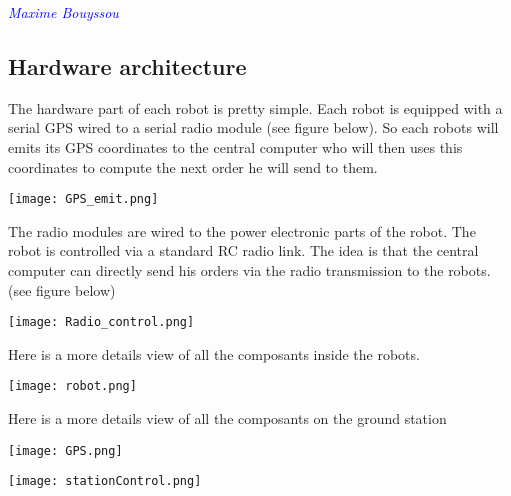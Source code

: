 \textcolor{blue}{\textit{Maxime Bouyssou}}



\subsection{Hardware architecture}
The hardware part of each robot is pretty simple. Each robot is equipped with a serial GPS wired to a serial radio module (see figure below). So each robots will emits its GPS coordinates to the central computer who will then uses this coordinates to compute the next order he will send to them.

\begin{center}
\texttt{[image: GPS\_emit.png]} 
\label{fig1}
\end{center}

The radio modules are wired to the power electronic parts of the robot. The robot is controlled via a standard RC radio link. The idea is that the central computer can directly send his orders via the radio transmission to the robots. (see figure below)

\begin{center}
\texttt{[image: Radio\_control.png]} 
\label{fig1}
\end{center}

Here is a more details view of all the composants inside the robots.

\begin{center}
\texttt{[image: robot.png]} 
\label{fig1}
\end{center}

Here is a more details view of all the composants on the ground station

\begin{center}
\texttt{[image: GPS.png]} 
\label{fig1}
\end{center}

\begin{center}
\texttt{[image: stationControl.png]} 
\label{fig1}
\end{center}